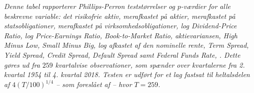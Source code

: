 \documentclass[
  a4paper,
  oneside]{memoir}
\begin{document}
\begin{table}[!h]
\begin{threeparttable}
\begin{tablenotes}
\item \textit{Denne tabel rapporterer Phillips-Perron teststørrelser og $p$-værdier for alle beskrevne variable: det risikofrie aktiv, merafkastet på aktier, merafkastet på statsobligationer, merafkastet på virksomhedsobligationer, log Dividend-Price Ratio, log Price-Earnings Ratio, Book-to-Market Ratio, aktievariansen, High Minus Low, Small Minus Big, log afkastet af den nominelle rente, Term Spread, Yield Spread, Credit Spread, Default Spread samt Federal Funds Rate, \citep{Phillips1988}. Dette gøres ud fra $259$ kvartalvise observationer, som spænder over kvartalerne fra 2. kvartal 1954 til 4. kvartal 2018. Testen er udført for et lag fastsat til heltalsdelen af $4(T/100)^{1/4}$ -- som foreslået af \citep{Schwert1989} -- hvor $T=259$.}
\end{tablenotes}
\end{threeparttable}
\end{table}
\end{document}
